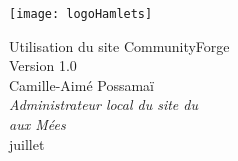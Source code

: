 \thispagestyle{empty}
\pagecolor[rgb]{0.08,0.3,0.25}\afterpage{\pagecolor[rgb]{.95,.94,.86}}%
\vspace*{-3cm}
\texttt{[image: logoHamlets]}

\vspace{10mm}

\enlargethispage{3cm}
\begin{minipage}{\linewidth}  
    \vspace*{20mm}
    \begin{flushright}
     \textsf{\huge\color[rgb]{.98,.77,.05}\fontsize{28}{28}\selectfont Utilisation du site CommunityForge}\\[2mm]
     \textsf{\color[rgb]{.98,.77,.05}Version 1.0}\\[17mm]
     {\Large\color[rgb]{.98,.77,.05} Camille-Aimé {\sc Possamaï}}\\[2mm]
     \textsl{\color[rgb]{.98,.77,.05}Administrateur local du site du\\ \CdS aux Mées\\}
     \vspace{123mm}
     {\Large\color[rgb]{.98,.77,.05} juillet }
    \end{flushright}    
    \vfill\null
\end{minipage}

\newpage\ \thispagestyle{empty}\newpage
